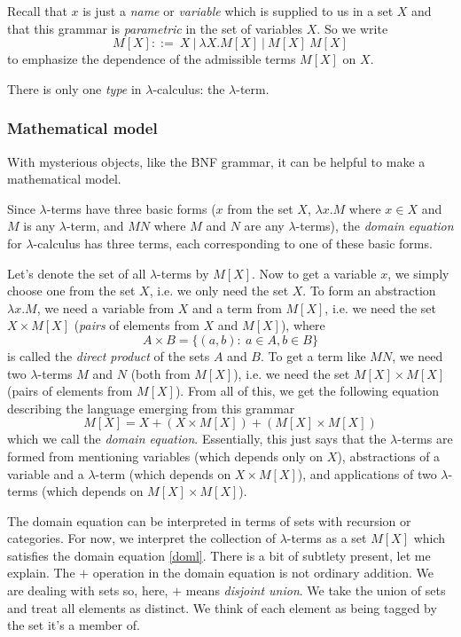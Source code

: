 \documentclass[12pt]{article}
\numberwithin{equation}{section}
\begin{document}
Recall that $x$ is just a \emph{name} or \emph{variable} which is supplied to us in a set $X$ and that this grammar is \emph{parametric} in the set of variables $X$. So we write
\[ M[X] ::= \ X \ | \ \lambda X.M[X] \ | \ M[X] \  M[X] \]
to emphasize the dependence of the admissible terms $M[X]$ on $X$.

There is only one \emph{type} in $\lambda$-calculus: the $\lambda$-term.

\subsubsection{Mathematical model}
With mysterious objects, like the BNF grammar, it can be helpful to make a mathematical model.

Since $\lambda$-terms have three basic forms ($x$ from the set $X$, $\lambda x. M$ where $x \in X$ and $M$ is any $\lambda$-term, and $M N$ where $M$ and $N$ are any $\lambda$-terms), the \emph{domain equation} for $\lambda$-calculus has three terms, each corresponding to one of these basic forms. 

Let's denote the set of all $\lambda$-terms by $M[X]$. Now to get a variable $x$, we simply choose one from the set $X$, i.e. we only need the set $X$. To form an abstraction $\lambda x. M$, we need a variable from $X$ and a term from $M[X]$, i.e. we need the set $X \times M[X]$ (\emph{pairs} of elements from $X$ and $M[X]$), where
\[ A \times B = \{ (a,b) : \ a \in A, b \in B \} \]
is called the \emph{direct product} of the sets $A$ and $B$. To get a term like $M N$, we need two $\lambda$-terms $M$ and $N$ (both from $M[X]$), i.e. we need the set $M[X] \times M[X]$ (pairs of elements from $M[X]$). From all of this, we get the following equation describing the language emerging from this grammar
\begin{equation} \label{doml}
M[X] = X + (X \times M[X]) + (M[X] \times M[X])
\end{equation}
which we call the \emph{domain equation}. Essentially, this just says that the $\lambda$-terms are formed from mentioning variables (which depends only on $X$), abstractions of a variable and a $\lambda$-term (which depends on $X \times M[X]$), and applications of two $\lambda$-terms (which depends on $M[X] \times M[X]$).

The domain equation can be interpreted in terms of sets with recursion or categories. For now, we interpret the collection of $\lambda$-terms as a set $M[X]$ which satisfies the domain equation \eqref{doml}. There is a bit of subtlety present, let me explain. The $+$ operation in the domain equation is not ordinary addition. We are dealing with sets so, here, $+$ means \emph{disjoint union}. We take the union of sets and treat all elements as distinct. We think of each element as being tagged by the set it's a member of.
\end{document}
